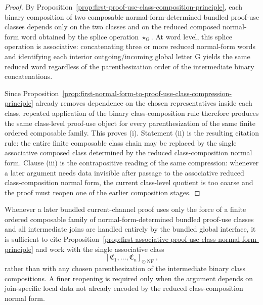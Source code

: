 \begin{proof}
By Proposition~\ref{prop:first-proof-use-class-composition-principle}, each binary composition of two composable normal-form-determined bundled proof-use classes depends only on the two classes and on the reduced composed normal-form word obtained by the splice operation \(\star_{\mathrm G}\). At word level, this splice operation is associative: concatenating three or more reduced normal-form words and identifying each interior outgoing/incoming global letter \(\mathrm G\) yields the same reduced word regardless of the parenthesization order of the intermediate binary concatenations.

Since Proposition~\ref{prop:first-normal-form-to-proof-use-class-compression-principle} already removes dependence on the chosen representatives inside each class, repeated application of the binary class-composition rule therefore produces the same class-level proof-use object for every parenthesization of the same finite ordered composable family. This proves (i). Statement (ii) is the resulting citation rule: the entire finite composable class chain may be replaced by the single associative composed class determined by the reduced class-composition normal form. Clause (iii) is the contrapositive reading of the same compression: whenever a later argument needs data invisible after passage to the associative reduced class-composition normal form, the current class-level quotient is too coarse and the proof must reopen one of the earlier composition stages.
\end{proof}

\begin{corollary}
\label{cor:use-rule-for-the-first-associative-proof-use-class-normal-form-principle}
Whenever a later bundled current-channel proof uses only the force of a finite ordered composable family of normal-form-determined bundled proof-use classes and all intermediate joins are handled entirely by the bundled global interface, it is sufficient to cite Proposition~\ref{prop:first-associative-proof-use-class-normal-form-principle} and work with the single associative class
\[
[\mathfrak C_1,\dots,\mathfrak C_n]_{\odot\operatorname{NF}},
\]
rather than with any chosen parenthesization of the intermediate binary class compositions. A finer reopening is required only when the argument depends on join-specific local data not already encoded by the reduced class-composition normal form.
\end{corollary}

